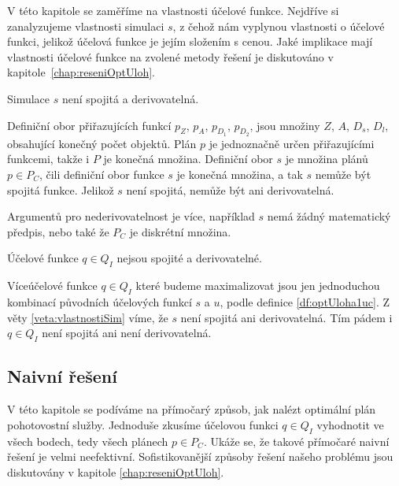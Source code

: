 V této kapitole se zaměříme na vlastnosti účelové funkce.
Nejdříve si zanalyzujeme vlastnosti simulaci $s$, z čehož nám vyplynou vlastnosti o účelové funkci, jelikož účelová funkce je jejím složením s cenou.
Jaké implikace mají vlastnosti účelové funkce na zvolené metody řešení je diskutováno v kapitole~\ref{chap:reseniOptUloh}.

\begin{veta}\label{veta:vlastnostiSim}
  Simulace $s$ není spojitá a derivovatelná.
\end{veta}

\begin{dukaz}
  Definiční obor přiřazujících funkcí $p_Z$, $p_A$, $p_{D_{1}}$, $p_{D_{2}}$, jsou množiny $Z$, $A$, $D_s$, $D_l$, obsahující konečný počet objektů.
  Plán $p$ je jednoznačně určen přiřazujícími funkcemi, takže i $P$ je konečná množina.
  Definiční obor $s$ je množina plánů $p \in P_C$, čili definiční obor funkce $s$ je konečná množina, a tak $s$ nemůže být spojitá funkce.
  Jelikož $s$ není spojitá, nemůže být ani derivovatelná.

  Argumentů pro nederivovatelnost je více, například $s$ nemá žádný matematický předpis, nebo také že $P_C$ je diskrétní množina.
\end{dukaz}

\begin{veta}\label{veta:nespANedevQ}
  Účelové funkce $q \in Q_I$ nejsou spojité a derivovatelné.
\end{veta}

\begin{dukaz}
  Víceúčelové funkce $q \in Q_I$ které budeme maximalizovat jsou jen jednoduchou kombinací původních účelových funkcí $s$ a $u$, podle definice \ref{df:optUloha1uc}.
  Z věty \ref{veta:vlastnostiSim} víme, že $s$ není spojitá ani derivovatelná.
  Tím pádem i $q \in Q_I$ není spojitá ani není derivovatelná.
\end{dukaz}

\subsection{Naivní řešení}\label{kap:naivniRes}

V této kapitole se podíváme na přímočarý způsob, jak nalézt optimální plán pohotovostní služby. 
Jednoduše zkusíme účelovou funkci $q \in Q_I$ vyhodnotit ve všech bodech, tedy všech plánech $p \in P_C$.
Ukáže se, že takové přímočaré naivní řešení je velmi neefektivní. Sofistikovanější způsoby řešení našeho problému jsou diskutovány v kapitole \ref{chap:reseniOptUloh}.


